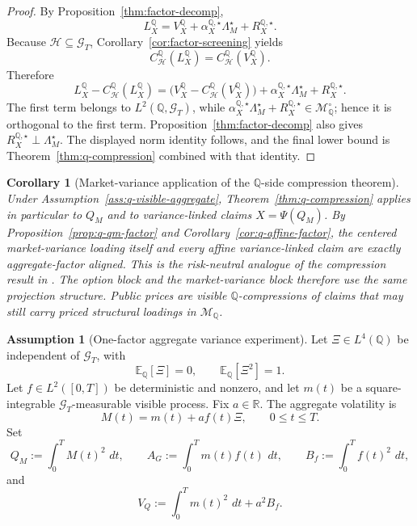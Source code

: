 \documentclass[11pt,a4paper]{amsart}
\theoremstyle{plain}
\newtheorem{corollary}[theorem]{Corollary}
\theoremstyle{definition}
\newtheorem{assumption}[theorem]{Assumption}
\theoremstyle{remark}
\newcommand{\R}{\mathbb{R}}
\newcommand{\QQ}{\mathbb{Q}}
\newcommand{\EE}{\mathbb{E}}
\newcommand{\cG}{\mathcal{G}}
\newcommand{\cH}{\mathcal{H}}
\newcommand{\cM}{\mathcal{M}}
\newcommand{\dd}{\,d}
\begin{document}
\begin{proof}
By Proposition~\ref{thm:factor-decomp},
\[
        L_X^\QQ
        =
        V_X^\QQ+\alpha_X^{\QQ,\star}\Lambda_M^\star+R_X^{\QQ,\star}.
\]
Because \(\cH\subseteq\cG_T\), Corollary~\ref{cor:factor-screening} yields
\[
        C_{\cH}^\QQ(L_X^\QQ)=C_{\cH}^\QQ(V_X^\QQ).
\]
Therefore
\[
        L_X^\QQ-C_{\cH}^\QQ(L_X^\QQ)
        =
        \bigl(V_X^\QQ-C_{\cH}^\QQ(V_X^\QQ)\bigr)
        +
        \alpha_X^{\QQ,\star}\Lambda_M^\star
        +
        R_X^{\QQ,\star}.
\]
The first term belongs to \(L^2(\QQ,\cG_T)\), while
\(\alpha_X^{\QQ,\star}\Lambda_M^\star+R_X^{\QQ,\star}\in\cM_\QQ^\circ\); hence it is orthogonal to
the first term.  Proposition~\ref{thm:factor-decomp} also gives
\(R_X^{\QQ,\star}\perp\Lambda_M^\star\).  The displayed norm identity follows, and the final lower
bound is Theorem~\ref{thm:q-compression} combined with that identity.
\end{proof}

\begin{corollary}[Market-variance application of the \(\QQ\)-side compression theorem]\label{cor:market-transfer}
Under Assumption~\ref{ass:q-visible-aggregate}, Theorem~\ref{thm:q-compression} applies in
particular to \(Q_M\) and to variance-linked claims \(X=\Psi(Q_M)\).  By
Proposition~\ref{prop:q-qm-factor} and Corollary~\ref{cor:q-affine-factor}, the centered
market-variance loading itself and every affine variance-linked claim are exactly aggregate-factor
aligned.  This is the risk-neutral analogue of the compression result in \cite{vidal2026market}.
The option block and the market-variance block therefore use the same projection structure.  Public
prices are visible \(\QQ\)-compressions of claims that may still carry priced structural loadings in
\(\cM_\QQ\).
\end{corollary}

\begin{assumption}[One-factor aggregate variance experiment]\label{ass:one-factor-variance}
Let \(\Xi\in L^4(\QQ)\) be independent of \(\cG_T\), with
\[
        \EE_\QQ[\Xi]=0,
        \qquad
        \EE_\QQ[\Xi^2]=1.
\]
Let \(f\in L^2([0,T])\) be deterministic and nonzero, and let \(m(t)\) be a square-integrable
\(\cG_T\)-measurable visible process.  Fix \(a\in\R\).  The aggregate volatility is
\[
        M(t)=m(t)+a f(t)\Xi,
        \qquad
        0\le t\le T.
\]
Set
\[
        Q_M:=\int_0^TM(t)^2\,\dd t,
        \qquad
        A_G:=\int_0^Tm(t)f(t)\,\dd t,
        \qquad
        B_f:=\int_0^Tf(t)^2\,\dd t,
\]
and
\[
        V_Q:=\int_0^Tm(t)^2\,\dd t+a^2B_f.
\]
\end{assumption}
\end{document}
